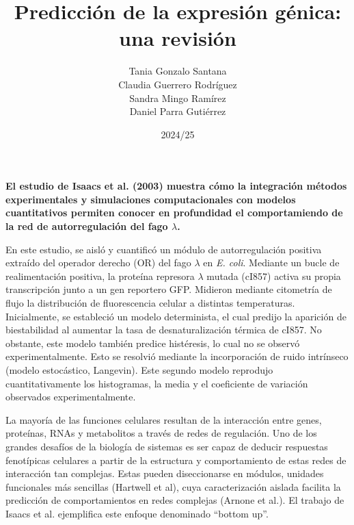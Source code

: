 \documentclass[nochap]{config/ejercicios}
\title{Predicción de la expresión génica: una revisión}
\author{Tania Gonzalo Santana \\ Claudia Guerrero Rodríguez \\ Sandra Mingo Ramírez \\ Daniel Parra Gutiérrez }
\date{2024/25}
\begin{document}
\maketitle

\large
\textbf{El estudio de Isaacs et al. (2003) muestra cómo la integración métodos experimentales y simulaciones computacionales con modelos cuantitativos permiten conocer en profundidad el comportamiendo de la red de autorregulación del fago $\lambda$.}
\normalsize

En este estudio, se aisló y cuantificó un módulo de autorregulación positiva extraído del operador derecho (OR) del fago $\lambda$ en \textit{E. coli}. Mediante un bucle de realimentación positiva, la proteína represora $\lambda$ mutada (cI857) activa su propia transcripción junto a un gen reportero GFP. Midieron mediante citometría de flujo la distribución de fluorescencia celular a distintas temperaturas. Inicialmente, se estableció un modelo determinista, el cual predijo la aparición de biestabilidad al aumentar la tasa de desnaturalización térmica de cI857. No obstante, este modelo también predice histéresis, lo cual no se observó experimentalmente. Esto se resolvió mediante la incorporación de ruido intrínseco (modelo estocástico, Langevin). Este segundo modelo reprodujo cuantitativamente los histogramas, la media y el coeficiente de variación observados experimentalmente.

La mayoría de las funciones celulares resultan de la interacción entre genes, proteínas, RNAs y metabolitos a través de redes de regulación. Uno de los grandes desafíos de la biología de sistemas es ser capaz de deducir respuestas fenotípicas celulares a partir de la estructura y comportamiento de estas redes de interacción tan complejas. Estas pueden diseccionarse en módulos, unidades funcionales más sencillas (Hartwell et al), cuya caracterización aislada facilita la predicción de comportamientos en redes complejas (Arnone et al.). El trabajo de Isaacs et al. ejemplifica este enfoque  denominado “bottom up”.
\end{document}
